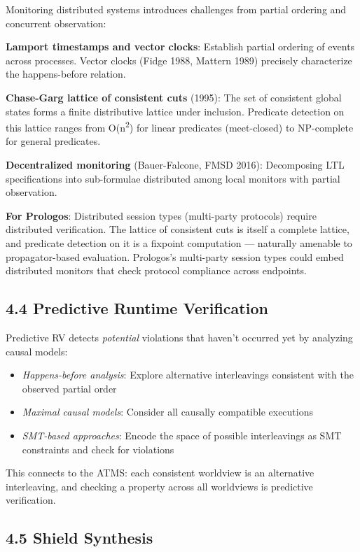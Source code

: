 \documentclass[11pt]{article}
\begin{document}
Monitoring distributed systems introduces challenges from partial ordering
and concurrent observation:

\textbf{Lamport timestamps and vector clocks}: Establish partial ordering of events
across processes. Vector clocks (Fidge 1988, Mattern 1989) precisely
characterize the happens-before relation.

\textbf{Chase-Garg lattice of consistent cuts} (1995): The set of consistent global
states forms a finite distributive lattice under inclusion. Predicate
detection on this lattice ranges from O(n\textsuperscript{2}) for linear predicates
(meet-closed) to NP-complete for general predicates.

\textbf{Decentralized monitoring} (Bauer-Falcone, FMSD 2016): Decomposing LTL
specifications into sub-formulae distributed among local monitors with
partial observation.

\textbf{For Prologos}: Distributed session types (multi-party protocols) require
distributed verification. The lattice of consistent cuts is itself a complete
lattice, and predicate detection on it is a fixpoint computation --- naturally
amenable to propagator-based evaluation. Prologos's multi-party session types
could embed distributed monitors that check protocol compliance across
endpoints.
\subsection{4.4 Predictive Runtime Verification}
\label{sec:orga7a2d92}

Predictive RV detects \emph{potential} violations that haven't occurred yet by
analyzing causal models:
\begin{itemize}
\item \emph{Happens-before analysis}: Explore alternative interleavings consistent with
the observed partial order
\item \emph{Maximal causal models}: Consider all causally compatible executions
\item \emph{SMT-based approaches}: Encode the space of possible interleavings as SMT
constraints and check for violations
\end{itemize}

This connects to the ATMS: each consistent worldview is an alternative
interleaving, and checking a property across all worldviews is predictive
verification.
\subsection{4.5 Shield Synthesis}
\label{sec:org2fcbf00}
\end{document}
